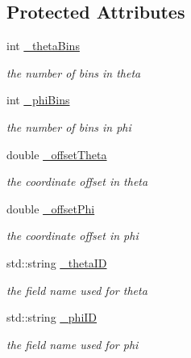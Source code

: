 \subsection*{Protected Attributes}
\begin{DoxyCompactItemize}
\item 
int \hyperlink{class_d_d4hep_1_1_d_d_segmentation_1_1_projective_cylinder_a3a9abd6b200a4093f80607c63cb60a27}{\+\_\+theta\+Bins}
\begin{DoxyCompactList}\small\item\em the number of bins in theta \end{DoxyCompactList}\item 
int \hyperlink{class_d_d4hep_1_1_d_d_segmentation_1_1_projective_cylinder_a80805ac35e9e3580d0d4e8dd0285ca4e}{\+\_\+phi\+Bins}
\begin{DoxyCompactList}\small\item\em the number of bins in phi \end{DoxyCompactList}\item 
double \hyperlink{class_d_d4hep_1_1_d_d_segmentation_1_1_projective_cylinder_afb07d1274b199b7d48c6c915e149e5a6}{\+\_\+offset\+Theta}
\begin{DoxyCompactList}\small\item\em the coordinate offset in theta \end{DoxyCompactList}\item 
double \hyperlink{class_d_d4hep_1_1_d_d_segmentation_1_1_projective_cylinder_aef1c8efbfba086c1df77dee8d24eb877}{\+\_\+offset\+Phi}
\begin{DoxyCompactList}\small\item\em the coordinate offset in phi \end{DoxyCompactList}\item 
std\+::string \hyperlink{class_d_d4hep_1_1_d_d_segmentation_1_1_projective_cylinder_aa236579151e799c5aee4526a2fbbbdb2}{\+\_\+theta\+ID}
\begin{DoxyCompactList}\small\item\em the field name used for theta \end{DoxyCompactList}\item 
std\+::string \hyperlink{class_d_d4hep_1_1_d_d_segmentation_1_1_projective_cylinder_a371344e0fee63cfe8e6c58cf9132fde2}{\+\_\+phi\+ID}
\begin{DoxyCompactList}\small\item\em the field name used for phi \end{DoxyCompactList}\end{DoxyCompactItemize}
